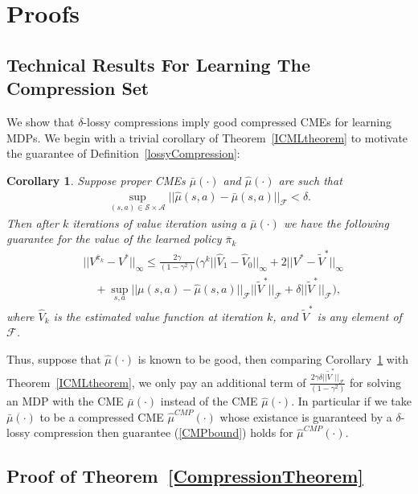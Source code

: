 \documentclass[letterpaper]{article}
\newtheorem{corollary}[theorem]{Corollary}
\newcommand{\cF}{{\mathcal F}}
\newcommand{\cA}{{\mathcal A}}
\newcommand{\cS}{{\mathcal S}}
\newcommand{\nn}{\nonumber}
\begin{document}
\section{Proofs}

\subsection{Technical Results For Learning The Compression Set} \label{learningCompressionAppendix}

We show that $\delta$-lossy compressions imply good compressed CMEs for learning MDPs. We begin with a trivial corollary of Theorem~\ref{ICMLtheorem} to motivate the guarantee of Definition~\ref{lossyCompression}:

\begin{corollary} \label{ICMLcorollary}
Suppose proper CMEs $\bar\mu(\cdot)$ and $\hat\mu(\cdot)$ are such that
\begin{align}
\sup_{(s,a)\in\cS\times\cA}||\hat\mu(s,a) - \bar\mu(s,a)||_\cF < \delta.
\end{align}
Then after $k$ iterations of value iteration using a  $\bar\mu(\cdot)$ we have the following guarantee for the value of the learned policy $\bar\pi_k$
\begin{align}
&||V^{\bar\pi_k} - V^*||_{\infty}\le \frac{2\gamma}{(1-\gamma^2)}\Big( \gamma^k ||\hat V_1 - \hat V_0||_{\infty} + 2|| V^* - \tilde V^* ||_{\infty}  \nn\\
&\quad+\sup_{s,a} ||\mu(s,a) - \hat\mu(s,a)||_{\cF}||\tilde V^*||_{\cF} + \delta||\tilde V^*||_{\cF} \Big), \label{CMPbound}
\end{align}
where $\hat V_k$ is the estimated value function at iteration $k$, and $\tilde V^*$ is any element of $\cF$.
\end{corollary}
Thus, suppose that $\hat\mu(\cdot)$ is known to be good, then comparing Corollary~\ref{ICMLcorollary} with Theorem~\ref{ICMLtheorem}, we only pay an additional term of $\frac{2\gamma \delta||\tilde V^*||_{\cF}}{(1-\gamma^2)}$ for solving an MDP with the CME $\bar\mu(\cdot)$ instead of the CME $\hat\mu(\cdot)$. In particular if we take $\bar\mu(\cdot)$ to be a compressed CME $\hat \mu^{CMP}(\cdot)$ whose existance is guaranteed by a $\delta$-lossy compression then guarantee (\ref{CMPbound}) holds for $\hat \mu^{CMP}(\cdot)$.

\subsection{Proof of Theorem~\ref{CompressionTheorem}}
\end{document}
